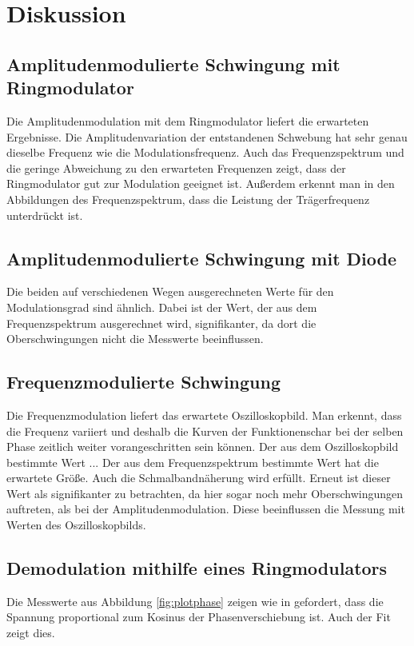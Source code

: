 \section{Diskussion}
\label{sec:Diskussion}

\subsection{Amplitudenmodulierte Schwingung mit Ringmodulator}

Die Amplitudenmodulation mit dem Ringmodulator liefert die erwarteten Ergebnisse. Die Amplitudenvariation der entstandenen Schwebung hat sehr genau dieselbe Frequenz  wie die Modulationsfrequenz. Auch das Frequenzspektrum und die geringe Abweichung zu den erwarteten Frequenzen zeigt, dass der Ringmodulator gut zur Modulation geeignet ist. Außerdem erkennt man in den Abbildungen des Frequenzspektrum, dass die Leistung der Trägerfrequenz unterdrückt ist.

\subsection{Amplitudenmodulierte Schwingung mit Diode}

Die beiden auf verschiedenen Wegen ausgerechneten Werte für den Modulationsgrad sind ähnlich. Dabei ist der Wert, der aus dem Frequenzspektrum ausgerechnet wird, signifikanter, da dort die Oberschwingungen nicht die Messwerte beeinflussen.

\subsection{Frequenzmodulierte Schwingung}

Die Frequenzmodulation liefert das erwartete Oszilloskopbild. Man erkennt, dass die Frequenz variiert und deshalb die Kurven der Funktionenschar bei der selben Phase zeitlich weiter vorangeschritten sein können. Der aus dem Oszilloskopbild bestimmte Wert ...
Der aus dem Frequenzspektrum bestimmte Wert hat die erwartete Größe. Auch die Schmalbandnäherung wird erfüllt. Erneut ist dieser Wert als signifikanter zu betrachten, da hier sogar noch mehr Oberschwingungen auftreten, als bei der Amplitudenmodulation. Diese beeinflussen die Messung mit Werten des Oszilloskopbilds.


\subsection{Demodulation mithilfe eines Ringmodulators}
Die Messwerte aus Abbildung \ref{fig:plotphase} zeigen  wie in \cite{anleitung} gefordert, dass die Spannung proportional zum Kosinus der Phasenverschiebung ist. Auch der Fit zeigt dies.

